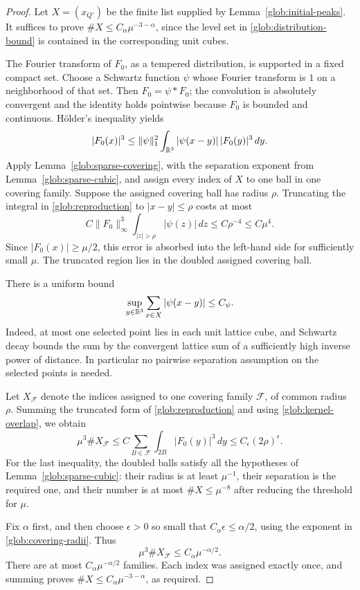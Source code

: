 \begin{proof}
Let $X=(x_{Q'})$ be the finite list supplied by
Lemma~\ref{glob:initial-peaks}. It suffices to prove
$\#X\le C_\alpha\mu^{-3-\alpha}$, since the level set in
\eqref{glob:distribution-bound} is contained in the corresponding
unit cubes.

The Fourier transform of $F_0$, as a tempered distribution, is
supported in a fixed compact set. Choose a Schwartz function
$\psi$ whose Fourier transform is $1$ on a neighborhood of that
set. Then $F_0=\psi*F_0$; the convolution is absolutely convergent
and the identity holds pointwise because $F_0$ is bounded and
continuous. Hölder's inequality yields
\begin{equation}\label{glob:reproduction}
 |F_0(x)|^3
 \le\|\psi\|_1^2
        \int_{\mathbb R^3}|\psi(x-y)|\,|F_0(y)|^3\,dy.
\end{equation}
Apply Lemma~\ref{glob:sparse-covering}, with the separation exponent
from Lemma~\ref{glob:sparse-cubic}, and assign every index of $X$
to one ball in one covering family. Suppose the assigned covering
ball has radius $\rho$. Truncating the integral in
\eqref{glob:reproduction} to $|x-y|\le\rho$ costs at most
\[
       C\|F_0\|_\infty^3
                \int_{|z|>\rho}|\psi(z)|\,dz
                    \le C\rho^{-4}\le C\mu^4.
\]
Since $|F_0(x)|\ge\mu/2$, this error is absorbed into the
left-hand side for sufficiently small $\mu$. The truncated region
lies in the doubled assigned covering ball.

There is a uniform bound
\begin{equation}\label{glob:kernel-overlap}
           \sup_{y\in\mathbb R^3}\sum_{x\in X}|\psi(x-y)|\le C_\psi.
\end{equation}
Indeed, at most one selected point lies in each unit lattice cube,
and Schwartz decay bounds the sum by the convergent lattice sum of
a sufficiently high inverse power of distance. In particular no
pairwise separation assumption on the selected points is needed.

Let $X_{\mathcal F}$ denote the indices assigned to one covering
family $\mathcal F$, of common radius $\rho$. Summing the truncated
form of \eqref{glob:reproduction} and using
\eqref{glob:kernel-overlap}, we obtain
\[
       \mu^3\#X_{\mathcal F}
       \le C\sum_{B\in\mathcal F}\int_{2B}|F_0(y)|^3\,dy
       \le C_\epsilon(2\rho)^\epsilon.
\]
For the last inequality, the doubled balls satisfy all the
hypotheses of Lemma~\ref{glob:sparse-cubic}: their radius is at
least $\mu^{-1}$, their separation is the required one, and their
number is at most $\#X\le\mu^{-8}$ after reducing the threshold
for $\mu$.

Fix $\alpha$ first, and then choose $\epsilon>0$ so small that
$C_\alpha\epsilon\le\alpha/2$, using the exponent in
\eqref{glob:covering-radii}. Thus
\[
       \mu^3\#X_{\mathcal F}\le C_\alpha\mu^{-\alpha/2}.
\]
There are at most $C_\alpha\mu^{-\alpha/2}$ families. Each index
was assigned exactly once, and summing proves
$\#X\le C_\alpha\mu^{-3-\alpha}$, as required.
\end{proof}

